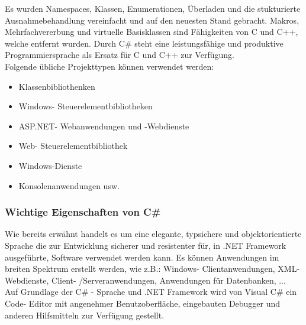 \documentclass[12pt,a4paper]{report}
\begin{document}
\begin{onehalfspace}
Es wurden Namespaces, Klassen, Enumerationen, Überladen und die stukturierte Ausnahmebehandlung vereinfacht und auf den neuesten Stand gebracht. Makros, Mehrfachvererbung und virtuelle Basisklassen sind Fähigkeiten von C und C++, welche entfernt wurden. Durch C\# steht eine leistungsfähige und produktive Programmiersprache als Ersatz für C und C++ zur Verfügung.
\\Folgende übliche Projekttypen können verwendet werden:
\begin{itemize}
\item Klassenbibliothenken
\item Windows- Steuerelementbibliotheken
\item ASP.NET- Webanwendungen und -Webdienste
\item Web- Steuerelementbibliothek
\item Windows-Dienste
\item Konsolenanwendungen usw.
\end{itemize}

\subsubsection{Wichtige Eigenschaften von C\#}
Wie bereits erwähnt handelt es um eine elegante, typsichere und objektorientierte Sprache die zur Entwicklung sicherer und resistenter für, in .NET Framework ausgeführte, Software verwendet werden kann. Es können Anwendungen im breiten Spektrum erstellt werden, wie z.B.: Windows- Clientanwendungen, XML- Webdienste, Client- /Serveranwendungen, Anwendungen für Datenbanken, ...\\

Auf Grundlage der C\# - Sprache und .NET Framework wird von Visual C\# ein Code- Editor mit angenehmer Benutzoberfläche, eingebauten Debugger und anderen Hilfsmitteln zur Verfügung gestellt.\\


\end{onehalfspace}
\end{document}
